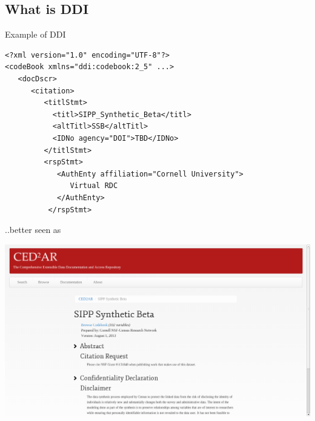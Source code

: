 
\subsection[DDI]{What is DDI}

\begin{frame}[fragile]{Example of DDI}
\begin{verbatim}
<?xml version="1.0" encoding="UTF-8"?>
<codeBook xmlns="ddi:codebook:2_5" ...>
   <docDscr>
      <citation>
         <titlStmt>
           <titl>SIPP_Synthetic_Beta</titl>
           <altTitl>SSB</altTitl>
           <IDNo agency="DOI">TBD</IDNo>
         </titlStmt>
         <rspStmt>
            <AuthEnty affiliation="Cornell University">
               Virtual RDC
            </AuthEnty>
          </rspStmt>
\end{verbatim}
\end{frame}

\begin{frame}{..better seen as}
\begin{center}
\includegraphics[width=0.9\linewidth]{ced2ar-ssb}
\end{center}
\end{frame}

